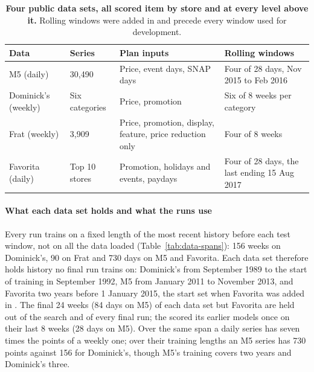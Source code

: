 \begin{table}[t]
\centering
\caption{\textbf{Four public data sets, all scored item by store and at every
level above it.} Rolling windows were added in \thisrev{} and precede every
window used for development.}
\label{tab:data}
\footnotesize
\renewcommand{\arraystretch}{1.2}
\setlength{\tabcolsep}{4pt}
\begin{tabular}{p{}p{}p{}p{}}
\toprule
\textbf{Data} & \textbf{Series} & \textbf{Plan inputs} & \textbf{Rolling windows} \\
\midrule
M5 (daily) & 30,490 & Price, event days, SNAP days & Four of 28 days, Nov 2015 to Feb 2016 \\
Dominick's (weekly) & Six categories & Price, promotion & Six of 8 weeks per category \\
Frat (weekly) & 3,909 & Price, promotion, display, feature, price reduction only & Four of 8 weeks \\
Favorita (daily) & Top 10 stores & Promotion, holidays and events, paydays & Four of 28 days, the last ending 15 Aug 2017 \\
\bottomrule
\end{tabular}
\end{table}

\paragraph{What each data set holds and what the runs use}
Every run trains on a fixed length of the most recent history before each test
window, not on all the data loaded (Table~\ref{tab:data-spans}): 156 weeks on
Dominick's, 90 on Frat and 730 days on M5 and Favorita. Each data set therefore
holds history no final run trains on: Dominick's from September 1989 to the
start of training in September 1992, M5 from January 2011 to November 2013, and
Favorita two years before 1 January 2015, the start set when Favorita was added
in \thisrev{}. The final 24 weeks (84 days on M5) of each data set but Favorita are
held out of the search and of every final run; the \fvpaper{} scored its earlier models once on
their last 8 weeks (28 days on M5). Over the same span a daily series has seven times the points of a weekly one;
over their training lengths an M5 series has 730 points against 156 for
Dominick's, though M5's training covers two years and Dominick's three.



